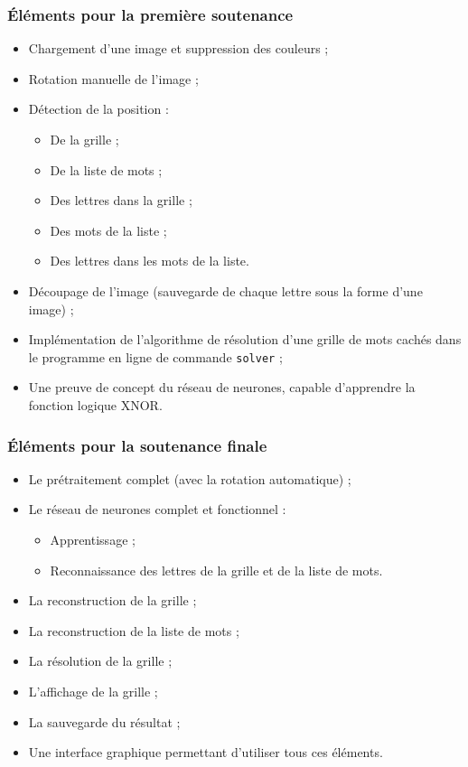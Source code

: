 \documentclass{article}
\begin{document}
\subsubsection*{Éléments pour la première soutenance}
\begin{itemize}
    \item[\Checkmark] Chargement d’une image et suppression des couleurs ;
    \item[\Checkmark] Rotation manuelle de l’image ;
    \item[\Checkmark] Détection de la position :
    \begin{itemize}
        \item De la grille ;
        \item De la liste de mots ;
        \item Des lettres dans la grille ;
        \item Des mots de la liste ;
        \item Des lettres dans les mots de la liste.
    \end{itemize}
    \item[\Checkmark] Découpage de l’image (sauvegarde de chaque lettre sous la forme d’une image) ;
    \item[\Checkmark] Implémentation de l’algorithme de résolution d’une grille de mots cachés dans le programme en ligne de commande \texttt{solver} ;
    \item[\Checkmark] Une preuve de concept du réseau de neurones, capable d’apprendre la fonction logique XNOR.
\end{itemize}

\subsubsection*{Éléments pour la soutenance finale}
\begin{itemize}
    \item[\PencilRight] Le prétraitement complet (avec la rotation automatique) ;
    \item[\PencilRight] Le réseau de neurones complet et fonctionnel :
    \begin{itemize}
        \item Apprentissage ;
        \item Reconnaissance des lettres de la grille et de la liste de mots.
    \end{itemize}
    \item[\Checkmark] La reconstruction de la grille ;
    \item[\Checkmark] La reconstruction de la liste de mots ;
    \item[\XSolidBrush] La résolution de la grille ;
    \item[\XSolidBrush] L’affichage de la grille ;
    \item[\XSolidBrush] La sauvegarde du résultat ;
    \item[\PencilRight] Une interface graphique permettant d’utiliser tous ces éléments.
\end{itemize}
\end{document}
